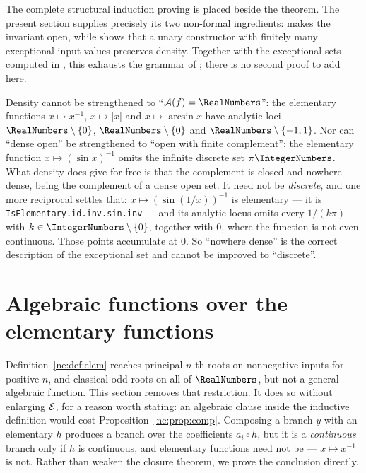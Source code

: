 The complete structural induction proving  is placed
beside the theorem.  The present section supplies precisely its two
non-formal ingredients:  makes the invariant open, while
 shows that a unary constructor with finitely many exceptional
input values preserves density.  Together with the exceptional sets computed
in , this exhausts the grammar of
; there is no second proof to add here.

\begin{remark}[Sharpness]
Density cannot be strengthened to ``$\An(f)=\RealNumbers$'': the elementary functions
$x\mapsto x^{-1}$, $x\mapsto|x|$ and $x\mapsto\arcsin x$ have analytic loci
$\RealNumbers\setminus\{0\}$, $\RealNumbers\setminus\{0\}$ and $\RealNumbers\setminus\{-1,1\}$.  Nor can
``dense open'' be strengthened to ``open with finite complement'': the
elementary function $x\mapsto (\sin x)^{-1}$ omits the infinite discrete set
$\pi\IntegerNumbers$.  What density does give for free is that the complement is closed
and nowhere dense, being the complement of a dense open set.  It need not be
\emph{discrete}, and one more reciprocal settles that: $x\mapsto(\sin(1/x))^{-1}$
is elementary --- it is \texttt{IsElementary.id.inv.sin.inv} --- and its
analytic locus omits every $1/(k\pi)$ with $k\in\IntegerNumbers\setminus\{0\}$, together
with $0$, where the function is not even continuous.  Those points accumulate
at $0$.  So ``nowhere dense'' is the correct description of the exceptional
set and cannot be improved to ``discrete''.
\end{remark}

\section[Algebraic branches]{Algebraic functions over the elementary functions}\label{ne:sec:algebraic}

Definition~\ref{ne:def:elem} reaches principal $n$-th roots on nonnegative inputs
for positive $n$, and classical odd roots on all of $\RealNumbers$, but not a general
algebraic function.  This section removes that restriction.  It does so without
enlarging $\mathcal E$, for a reason worth stating: an algebraic clause inside the
inductive definition would cost Proposition~\ref{ne:prop:comp}.  Composing a
branch $y$ with an elementary $h$ produces a branch over the coefficients
$a_i\circ h$, but it is a \emph{continuous} branch only if $h$ is continuous,
and elementary functions need not be --- $x\mapsto x^{-1}$ is not.  Rather than
weaken the closure theorem, we prove the conclusion directly.

